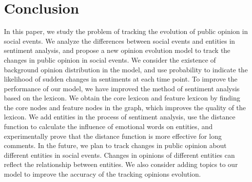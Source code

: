 \documentclass[runningheads]{llncs}
\begin{document}
\section{Conclusion}\label{sec:conclusion}
In this paper, we study the problem of tracking the evolution of public opinion in social events. We analyze the differences between social events and entities in sentiment analysis, and propose a new opinion evolution model to track the changes in public opinion in social events. We consider the existence of background opinion distribution in the model, and use probability to indicate the likelihood of sudden changes in sentiments at each time point. To improve the performance of our model, we have improved the method of sentiment analysis based on the lexicon. We obtain the core lexicon and feature lexicon by finding the core nodes and feature nodes in the graph, which improves the quality of the lexicon. We add entities in the process of sentiment analysis, use the distance function to calculate the influence of emotional words on entities, and experimentally prove that the distance function is more effective for long comments. In the future, we plan to track changes in public opinion about different entities in social events. Changes in opinions of different entities can reflect the relationship between entities. We also consider adding topics to our model to improve the accuracy of the tracking opinions evolution.
\end{document}
